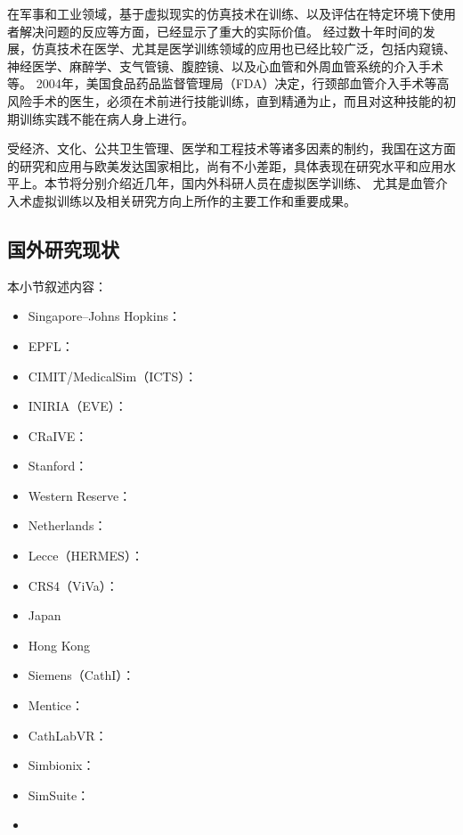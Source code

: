 
在军事和工业领域，基于虚拟现实的仿真技术在训练、以及评估在特定环境下使用者解决问题的反应等方面，已经显示了重大的实际价值\cite{Goodwin1978Simulator}\cite{Rolfe1986Simulators}\cite{Ressler1999Simulators}\cite{Wachtel1985Simulators}\cite{Liu2013Military}。
经过数十年时间的发展\cite{Dawson1998}，仿真技术在医学、尤其是医学训练领域的应用也已经比较广泛，包括内窥镜\cite{Vining1995Endoscopy}\cite{Preminger1996Endoscopy}、神经医学\cite{Kockro2000Neurosurgery}\cite{Cotin2005EVE}\cite{Ma2007NeuroCath}、麻醉学\cite{Gaba1988Anesthesiology}、支气管镜\cite{Vining1996Bronchoscopy}、腹腔镜\cite{Hon1994Laparoscopy}\cite{Derossis1998Laparoscopy}、以及心血管和外周血管系统的介入手术\cite{Chui1998ICard}\cite{Cotin2000ICTS}\cite{Tan2012NUDT}等。
2004年，美国食品药品监督管理局（FDA）决定，行颈部血管介入手术等高风险手术的医生，必须在术前进行技能训练，直到精通为止，而且对这种技能的初期训练实践不能在病人身上进行\cite{Dawson2006Medicine}。

受经济、文化、公共卫生管理、医学和工程技术等诸多因素的制约，我国在这方面的研究和应用与欧美发达国家相比，尚有不小差距，具体表现在研究水平和应用水平上。本节将分别介绍近几年，国内外科研人员在虚拟医学训练、
尤其是血管介入术虚拟训练以及相关研究方向上所作的主要工作和重要成果。

\subsection{国外研究现状}
\label{sec1-3-1}

本小节叙述内容：
\begin{itemize}
  \item Singapore--Johns Hopkins：
  \item EPFL：
  \item CIMIT/MedicalSim（ICTS）：
  \item INIRIA（EVE）：
  \item CRaIVE：
  \item Stanford：
  \item Western Reserve：
  \item Netherlands：
  \item Lecce（HERMES）：
  \item CRS4（ViVa）：\cite{abdoulaev1998}\cite{Zorcolo2000}\cite{Gobbetti1998}\cite{Gobbetti2000}\cite{Zorcolo1999}
  \item Japan
  \item Hong Kong
  \item Siemens（CathI）：
  \item Mentice：
  \item CathLabVR：\cite{caeweb}
  \item Simbionix：\cite{simbionixweb}
  \item SimSuite：\cite{simsuiteweb}
  \item \cite{Rahman2012}
\end{itemize}

